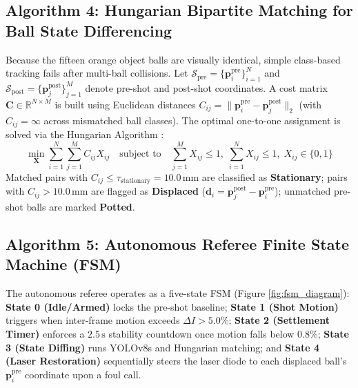 \subsection{Algorithm 4: Hungarian Bipartite Matching for Ball State Differencing}
Because the fifteen orange object balls are visually identical, simple class-based tracking fails after multi-ball collisions. Let $\mathcal{S}_{\text{pre}} = \{ \mathbf{p}_i^{\text{pre}} \}_{i=1}^{N}$ and $\mathcal{S}_{\text{post}} = \{ \mathbf{p}_j^{\text{post}} \}_{j=1}^{M}$ denote pre-shot and post-shot coordinates. A cost matrix $\mathbf{C} \in \mathbb{R}^{N \times M}$ is built using Euclidean distances $C_{ij} = \| \mathbf{p}_i^{\text{pre}} - \mathbf{p}_j^{\text{post}} \|_2$ (with $C_{ij} = \infty$ across mismatched ball classes). The optimal one-to-one assignment is solved via the Hungarian Algorithm \cite{ref40}:
\begin{equation}
    \min_{\mathbf{X}} \sum_{i=1}^N \sum_{j=1}^M C_{ij} X_{ij} \quad \text{subject to} \quad \sum_{j=1}^M X_{ij} \le 1, \; \sum_{i=1}^N X_{ij} \le 1, \; X_{ij} \in \{0, 1\}
\end{equation}
Matched pairs with $C_{ij} \le \tau_{\text{stationary}} = 10.0\,\text{mm}$ are classified as \textbf{Stationary}; pairs with $C_{ij} > 10.0\,\text{mm}$ are flagged as \textbf{Displaced} ($\mathbf{d}_i = \mathbf{p}_j^{\text{post}} - \mathbf{p}_i^{\text{pre}}$); unmatched pre-shot balls are marked \textbf{Potted}.

\subsection{Algorithm 5: Autonomous Referee Finite State Machine (FSM)}
The autonomous referee operates as a five-state FSM (Figure \ref{fig:fsm_diagram}): \textbf{State 0 (Idle/Armed)} locks the pre-shot baseline; \textbf{State 1 (Shot Motion)} triggers when inter-frame motion exceeds $\Delta I > 5.0\%$; \textbf{State 2 (Settlement Timer)} enforces a $2.5\,\text{s}$ stability countdown once motion falls below $0.8\%$; \textbf{State 3 (State Diffing)} runs YOLOv8s and Hungarian matching; and \textbf{State 4 (Laser Restoration)} sequentially steers the laser diode to each displaced ball's $\mathbf{p}_i^{\text{pre}}$ coordinate upon a foul call.

